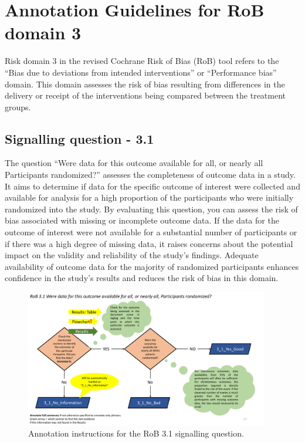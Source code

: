 \documentclass[sn-mathphys,Numbered]{sn-jnl}%
\begin{document}
%
%
%
\section*{Annotation Guidelines for RoB domain 3}
\label{sec:dom3}
%
Risk domain 3 in the revised Cochrane Risk of Bias (RoB) tool refers to the ``Bias due to deviations from intended interventions'' or ``Performance bias'' domain.
This domain assesses the risk of bias resulting from differences in the delivery or receipt of the interventions being compared between the treatment groups.
%
%
%
\subsection*{Signalling question - 3.1 }
%
The question ``Were data for this outcome available for all, or nearly all Participants randomized?'' assesses the completeness of outcome data in a study.
It aims to determine if data for the specific outcome of interest were collected and available for analysis for a high proportion of the participants who were initially randomized into the study.
By evaluating this question, you can assess the risk of bias associated with missing or incomplete outcome data.
If the data for the outcome of interest were not available for a substantial number of participants or if there was a high degree of missing data, it raises concerns about the potential impact on the validity and reliability of the study's findings.
Adequate availability of outcome data for the majority of randomized participants enhances confidence in the study's results and reduces the risk of bias in this domain.


%
%
%
\begin{figure}[hbt]
    \centering
    \includegraphics[width=0.95\textwidth]{figures/3_1.pdf}
    \caption{Annotation instructions for the RoB 3.1 signalling question.}
    \label{fig:3_1}
\end{figure}
%
%
%
\end{document}
